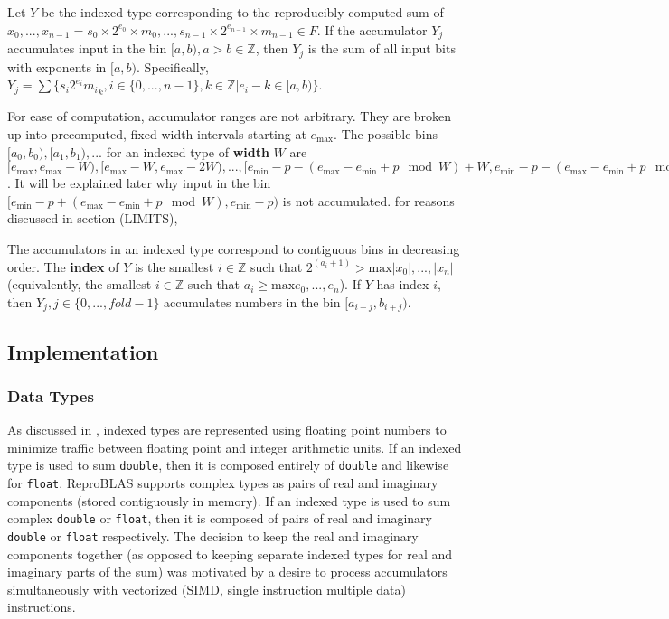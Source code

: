 \documentclass[12pt]{article}
\providecommand{\Z}{\ensuremath{\mathbb{Z}}}
\providecommand{\min}{\ensuremath{\text{min}}}
\providecommand{\max}{\ensuremath{\text{max}}}
\theoremstyle{plain}
\begin{document}
    Let $Y$ be the indexed type corresponding to the reproducibly computed sum of $x_0, ..., x_{n - 1} = s_0 \times 2^{e_0} \times m_0, ..., s_{n - 1} \times 2^{e_{n - 1}} \times m_{n - 1} \in F$.
    If the accumulator $Y_j$ accumulates input in the bin $[a, b), a > b \in \Z$, then $Y_j$ is the sum of all input bits with exponents in $[a, b)$. Specifically, $Y_j = \sum \{s_i2^{e_i}{m_i}_k, i \in \{0, ..., n - 1\}, k \in \Z | e_i - k \in [a, b)\}$.

    For ease of computation, accumulator ranges are not arbitrary. They are broken up into precomputed, fixed width intervals starting at $e_{\max}$. The possible bins $[a_0, b_0), [a_1, b_1), ...$ for an indexed type of \textbf{width} $W$ are $[e_{\max}, e_{\max} - W), [e_{\max} - W, e_{\max} - 2W), ..., [e_{\min} - p - (e_{\max} - e_{\min} + p \mod W) + W, e_{\min} - p - (e_{\max} - e_{\min} + p \mod W))$. It will be explained later why input in the bin $[e_{\min} - p + (e_{\max} - e_{\min} + p \mod W), e_{\min} - p)$ is not accumulated. for reasons discussed in section (LIMITS), 


    The accumulators in an indexed type correspond to contiguous bins in decreasing order. The \textbf{index} of $Y$ is the smallest $i \in \Z$ such that $2^(a_i + 1) > \max{|x_0|, ..., |x_n|}$ (equivalently, the smallest $i \in \Z$ such that $a_i \geq \max{e_0, ..., e_n}$). If $Y$ has index $i$, then $Y_j, j \in \{0, ..., fold - 1\}$ accumulates numbers in the bin $[a_{i + j}, b_{i + j})$.
  \subsection{Implementation}
    \subsubsection{Data Types}
      As discussed in \cite{repsum}, indexed types are represented using floating point numbers to minimize traffic between floating point and integer arithmetic units. If an indexed type is used to sum \verb|double|, then it is composed entirely of \verb|double| and likewise for \verb|float|. ReproBLAS supports complex types as pairs of real and imaginary components (stored contiguously in memory). If an indexed type is used to sum complex \verb|double| or \verb|float|, then it is composed of pairs of real and imaginary \verb|double| or \verb|float| respectively. The decision to keep the real and imaginary components together (as opposed to keeping separate indexed types for real and imaginary parts of the sum) was motivated by a desire to process accumulators simultaneously with vectorized (SIMD, single instruction multiple data) instructions.
\end{document}
